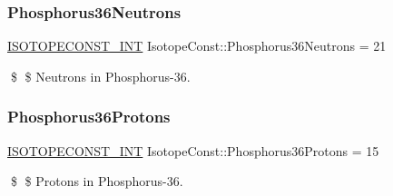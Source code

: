 \subsubsection{\texorpdfstring{Phosphorus36\+Neutrons}{Phosphorus36Neutrons}}
{\footnotesize\ttfamily \mbox{\hyperlink{group___isotope_const-_macros_ga5f18360b3e99483a35c32d789e62621c}{I\+S\+O\+T\+O\+P\+E\+C\+O\+N\+S\+T\+\_\+\+I\+NT}} Isotope\+Const\+::\+Phosphorus36\+Neutrons = 21}

\$ \$ Neutrons in Phosphorus-\/36. \mbox{\label{group___isotope_const-_phosphorus-_p36_gaecf1e11f3b52f3d39b55834271569297}} 
\subsubsection{\texorpdfstring{Phosphorus36\+Protons}{Phosphorus36Protons}}
{\footnotesize\ttfamily \mbox{\hyperlink{group___isotope_const-_macros_ga5f18360b3e99483a35c32d789e62621c}{I\+S\+O\+T\+O\+P\+E\+C\+O\+N\+S\+T\+\_\+\+I\+NT}} Isotope\+Const\+::\+Phosphorus36\+Protons = 15}

\$ \$ Protons in Phosphorus-\/36. 